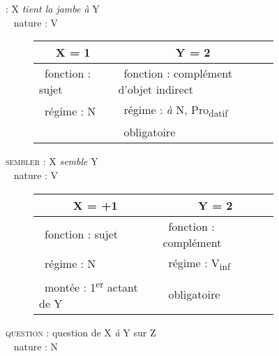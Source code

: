 \begin{figure}
	\begin{flushleft}
		 : X \textit{tient la jambe à} Y \\
		\textbullet~ nature : V
	\end{flushleft}
	\begin{subfigure}[h]{\textwidth}
		\centering
		\vspace*{-\baselineskip+5pt}
		\begin{tabularx}{\textwidth}{|X|l|}
			\hline
			\multicolumn{1}{|c|}{X = 1 } & \multicolumn{1}{c|}{Y = 2} \\
			\hline
			\textbullet~fonction : sujet & \textbullet~fonction : complément d’objet indirect \\
			\textbullet~régime : N & \textbullet~régime : \textit{à }N, Pro\textsubscript{datif}\\
			& \textbullet~obligatoire \\
			\hline
		\end{tabularx}	
	\end{subfigure}%
	\vfill
	\begin{flushleft}
		\textsc{sembler} : X \textit{semble} Y \\
		\textbullet~ nature : V
	\end{flushleft}
	\begin{subfigure}[h]{\textwidth}
		\centering
		\vspace*{-\baselineskip+5pt}
		\begin{tabularx}{\textwidth}{|X|X|}
			\hline
			\multicolumn{1}{|c|}{X = +1 } & \multicolumn{1}{c|}{Y = 2} \\
			\hline
			\textbullet~fonction : sujet & \textbullet~fonction : complément \\
			\textbullet~régime : N & \textbullet~régime : V\textsubscript{inf} \\
			\textbullet~montée : 1\textsuperscript{er} actant de Y & \textbullet~obligatoire \\
			\hline
		\end{tabularx}
	\end{subfigure}%
	\vfill
	\begin{flushleft}
		\textsc{question} : question de X \textit{à} Y sur Z \\
		\textbullet~ nature : N
	\end{flushleft}
	\begin{subfigure}[h]{\textwidth}
		\centering
		\vspace*{-\baselineskip+5pt}
		\begin{tabularx}{\textwidth}{|X|X|X|}

\end{tabularx}
\end{subfigure}
\end{figure}
